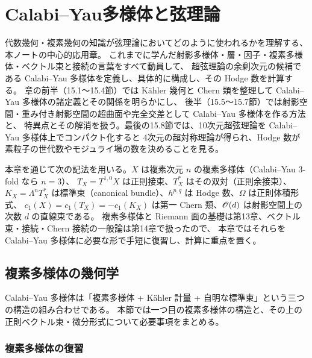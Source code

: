 \chapter{Calabi--Yau多様体と弦理論}
\label{ch:ch15}

\begin{chapterlead}
代数幾何・複素幾何の知識が弦理論においてどのように使われるかを理解する、本ノートの中心的応用章。
これまでに学んだ射影多様体・層・因子・複素多様体・ベクトル束と接続の言葉をすべて動員して、
超弦理論の余剰次元の候補である Calabi--Yau 多様体を定義し、具体的に構成し、その Hodge 数を計算する。
章の前半（15.1〜15.4節）では K\"ahler 幾何と Chern 類を整理して Calabi--Yau 多様体の諸定義とその関係を明らかにし、
後半（15.5〜15.7節）では射影空間・重み付き射影空間の超曲面や完全交差として Calabi--Yau 多様体を作る方法と、
特異点とその解消を扱う。最後の15.8節では、10次元超弦理論を Calabi--Yau 多様体上でコンパクト化すると
4次元の超対称理論が得られ、Hodge 数が素粒子の世代数やモジュライ場の数を決めることを見る。
\end{chapterlead}

本章を通じて次の記法を用いる。$X$ は複素次元 $n$ の複素多様体（Calabi--Yau 3-fold なら $n=3$）、
$T_X = T^{1,0}X$ は正則接束、$T^*_X$ はその双対（正則余接束）、
$K_X = \Lambda^n T^*_X$ は標準束（canonical bundle）、$h^{p,q}$ は Hodge 数、$\Omega$ は正則体積形式、
$c_1(X) = c_1(T_X) = -c_1(K_X)$ は第一 Chern 類、$\mathscr{O}(d)$ は射影空間上の次数 $d$ の直線束である。
複素多様体と Riemann 面の基礎は第13章、ベクトル束・接続・Chern 接続の一般論は第14章で扱ったので、
本章ではそれらを Calabi--Yau 多様体に必要な形で手短に復習し、計算に重点を置く。

\section{複素多様体の幾何学}

Calabi--Yau 多様体は「複素多様体 + K\"ahler 計量 + 自明な標準束」という三つの構造の組み合わせである。
本節では一つ目の複素多様体の構造と、その上の正則ベクトル束・微分形式について必要事項をまとめる。

\subsection{複素多様体の復習}

